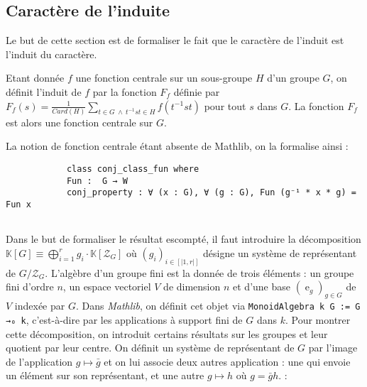 \documentclass[10pt]{article}
\theoremstyle{definition}
\DeclareMathOperator{\e}{e}
\begin{document}
 
 
\subsection{Caractère de l'induite}
Le but de cette section est de formaliser le fait que \og le caractère de l'induit est l'induit du caractère\fg.
\newline

Etant donnée $f$ une fonction centrale sur un sous-groupe $H$ d'un groupe $G$, on définit l'induit de $f$ par la fonction $F_f$ définie par $F_f(s)=\frac{1}{Card(H)}\sum\limits_{t\in G \ \wedge \ t^{-1}st\in H}f(t^{-1}st)$ pour tout $s$ dans $G$. La fonction $F_f$ est alors une fonction centrale sur $G$.
\newline

La notion de fonction centrale étant absente de Mathlib, on la formalise ainsi : 

\begin{center}
	\begin{tcolorbox}[title = $L\exists\forall N$,width=12cm,text width=12cm,colback=lightgray!30,
		colframe=gray,sharp corners,
		rounded corners=uphill ]
		\begin{lstlisting}
			class conj_class_fun where
			Fun :  G → W
			conj_property : ∀ (x : G), ∀ (g : G), Fun (g⁻¹ * x * g) = Fun x
			
		\end{lstlisting}
	\end{tcolorbox}
\end{center}
Dans le but de formaliser le résultat escompté, il faut introduire la décomposition $\mathbb{K}[G]\equiv \bigoplus\limits_{i=1}^rg_i\cdot\mathbb{K}[\mathcal{Z}_G]$ où $(g_i)_{i\in[\!|1,r|\!]}$ désigne un système de représentant de $G/\mathcal{Z}_G$.
\newline
L'algèbre d'un groupe fini est la donnée de trois éléments : un groupe fini d'ordre $n$, un espace vectoriel $V$ de dimension $n$ et d'une base $(\e_g)_{g\in G}$ de $V$ indexée par $G$. Dans \textit{Mathlib}, on définit cet objet via \lstinline|MonoidAlgebra k G := G →₀ k|, c'est-à-dire par les applications à support fini de $G$ dans $k$.
\newline
Pour montrer cette décomposition, on introduit certains résultats sur les groupes et leur quotient par leur centre. On définit un système de représentant de $G$ par l'image de l'application $g\mapsto \bar{g}$ et on lui associe deux autres application : une qui envoie un élément sur son représentant, et une autre $g\mapsto h$ où $g=\bar{g}h$. :
\end{document}
